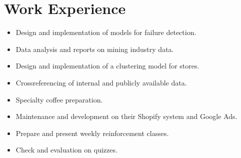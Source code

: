 \documentclass{my_cv}
\begin{document}
\section{Work Experience \faSuitcase}
\begin{itemize}
\item Design and implementation of models for failure detection.
\item Data analysis and reports on mining industry data. 
\end{itemize}
\begin{itemize}
\item Design and implementation of a clustering model for stores.
\item Crossreferencing of internal and publicly available data.
\end{itemize}
\begin{itemize}
\item Specialty coffee preparation.
\item Maintenance and development on their Shopify system and Google Ads. 
\end{itemize}
\begin{itemize}
\item Prepare and present weekly reinforcement classes.
\item Check and evaluation on quizzes.
\end{itemize}



\end{document}
